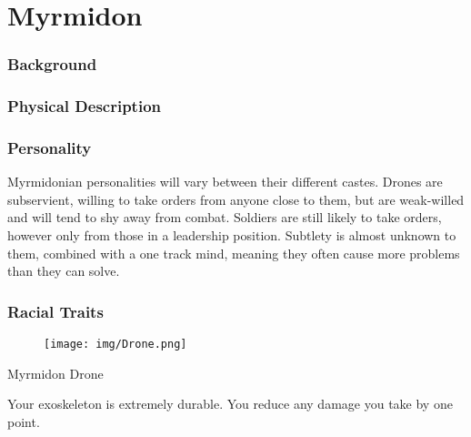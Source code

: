 \chapter*{Myrmidon}

\subsection*{Background}

\lipsum[1]

\subsection*{Physical Description}

\lipsum[1-2]

\subsection*{Personality}

Myrmidonian personalities will vary between their different castes. Drones are subservient, willing to take orders from anyone close to them, but are weak-willed and will tend to shy away from combat. Soldiers are still likely to take orders, however only from those in a leadership position. Subtlety is almost unknown to them, combined with a one track mind, meaning they often cause more problems than they can solve.

\subsection*{Racial Traits}

\begin{figure}[ht!]
	\texttt{[image: img/Drone.png]}
\end{figure}


\begin{monsterbox}{Myrmidon Drone}
	\vspace{.1in}
	\hline
	\stats[
	STR = -1,
	DEX = +1,
	VIT = +1,
	FOC = +1,
	WILL = -1
	]
	\hline
	
	\vspace{.1in}
	
	\begin{monsteraction}[Chitinous]
		Your exoskeleton is extremely durable. You reduce any damage you take by one point.
	\end{monsteraction}
\end{monsterbox}

